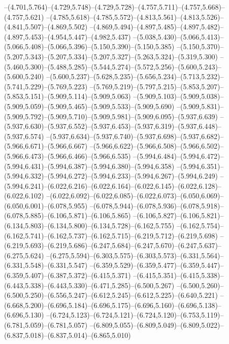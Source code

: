   --(4.701,5.764)--(4.729,5.748)--(4.729,5.728)--(4.757,5.711)--(4.757,5.668)--(4.757,5.621)%
  --(4.785,5.618)--(4.785,5.572)--(4.813,5.561)--(4.813,5.526)--(4.841,5.507)--(4.869,5.502)%
  --(4.869,5.494)--(4.897,5.485)--(4.897,5.482)--(4.897,5.453)--(4.954,5.447)--(4.982,5.437)%
  --(5.038,5.430)--(5.066,5.413)--(5.066,5.408)--(5.066,5.396)--(5.150,5.390)--(5.150,5.385)%
  --(5.150,5.370)--(5.207,5.343)--(5.207,5.334)--(5.207,5.327)--(5.263,5.324)--(5.319,5.300)%
  --(5.460,5.300)--(5.488,5.285)--(5.544,5.274)--(5.572,5.256)--(5.600,5.243)--(5.600,5.240)%
  --(5.600,5.237)--(5.628,5.235)--(5.656,5.234)--(5.713,5.232)--(5.741,5.229)--(5.769,5.223)%
  --(5.769,5.219)--(5.797,5.215)--(5.853,5.207)--(5.853,5.151)--(5.909,5.114)--(5.909,5.063)%
  --(5.909,5.103)--(5.909,5.038)--(5.909,5.059)--(5.909,5.465)--(5.909,5.533)--(5.909,5.690)%
  --(5.909,5.831)--(5.909,5.792)--(5.909,5.710)--(5.909,5.981)--(5.909,6.095)--(5.937,6.639)%
  --(5.937,6.630)--(5.937,6.552)--(5.937,6.453)--(5.937,6.319)--(5.937,6.448)--(5.937,6.574)%
  --(5.937,6.634)--(5.937,6.740)--(5.937,6.698)--(5.937,6.682)--(5.966,6.671)--(5.966,6.667)%
  --(5.966,6.622)--(5.966,6.508)--(5.966,6.502)--(5.966,6.473)--(5.966,6.466)--(5.966,6.535)%
  --(5.994,6.484)--(5.994,6.472)--(5.994,6.431)--(5.994,6.387)--(5.994,6.380)--(5.994,6.358)%
  --(5.994,6.351)--(5.994,6.332)--(5.994,6.272)--(5.994,6.233)--(5.994,6.267)--(5.994,6.249)%
  --(5.994,6.241)--(6.022,6.216)--(6.022,6.164)--(6.022,6.145)--(6.022,6.128)--(6.022,6.102)%
  --(6.022,6.092)--(6.022,6.085)--(6.022,6.073)--(6.050,6.069)--(6.050,6.001)--(6.078,5.955)%
  --(6.078,5.944)--(6.078,5.936)--(6.078,5.918)--(6.078,5.885)--(6.106,5.871)--(6.106,5.865)%
  --(6.106,5.827)--(6.106,5.821)--(6.134,5.803)--(6.134,5.800)--(6.134,5.728)--(6.162,5.755)%
  --(6.162,5.754)--(6.162,5.741)--(6.162,5.737)--(6.162,5.715)--(6.219,5.712)--(6.219,5.698)%
  --(6.219,5.693)--(6.219,5.686)--(6.247,5.684)--(6.247,5.670)--(6.247,5.637)--(6.275,5.624)%
  --(6.275,5.594)--(6.303,5.575)--(6.303,5.573)--(6.331,5.564)--(6.331,5.548)--(6.331,5.547)%
  --(6.359,5.529)--(6.359,5.477)--(6.359,5.447)--(6.359,5.407)--(6.387,5.372)--(6.415,5.371)%
  --(6.415,5.351)--(6.415,5.338)--(6.443,5.338)--(6.443,5.330)--(6.471,5.285)--(6.500,5.267)%
  --(6.500,5.260)--(6.500,5.250)--(6.556,5.247)--(6.612,5.245)--(6.612,5.225)--(6.640,5.221)%
  --(6.668,5.200)--(6.696,5.184)--(6.696,5.175)--(6.696,5.160)--(6.696,5.138)--(6.696,5.130)%
  --(6.724,5.123)--(6.724,5.121)--(6.724,5.120)--(6.753,5.119)--(6.781,5.059)--(6.781,5.057)%
  --(6.809,5.055)--(6.809,5.049)--(6.809,5.022)--(6.837,5.018)--(6.837,5.014)--(6.865,5.010)%
